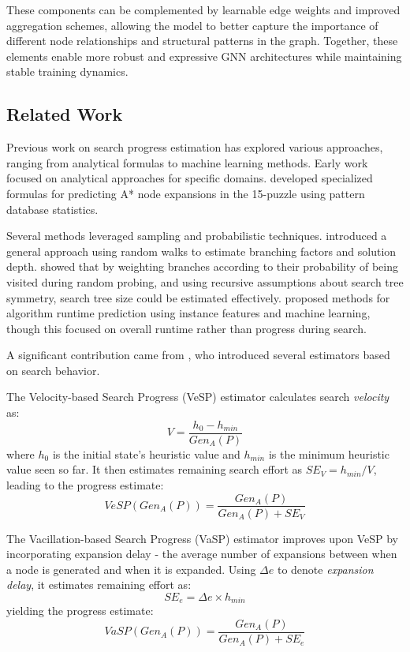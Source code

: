 \documentclass[letterpaper]{article}
\begin{document}
These components can be complemented by learnable edge weights and improved aggregation schemes, allowing the model to better capture the importance of different node relationships and structural patterns in the graph. Together, these elements enable more robust and expressive GNN architectures while maintaining stable training dynamics.


\subsection{Related Work}\label{subsec:related_work}

Previous work on search progress estimation has explored various approaches, ranging from analytical formulas to machine learning methods. Early work focused on analytical approaches for specific domains. \citet{breyer2008recent} developed specialized formulas for predicting A* node expansions in the 15-puzzle using pattern database statistics.

Several methods leveraged sampling and probabilistic techniques. \citet{lelis2014estimating} introduced a general approach using random walks to estimate branching factors and solution depth. \citet{kilby2006estimating} showed that by weighting branches according to their probability of being visited during random probing, and using recursive assumptions about search tree symmetry, search tree size could be estimated effectively. \citet{hutter2014algorithm} proposed methods for algorithm runtime prediction using instance features and machine learning, though this focused on overall runtime rather than progress during search.

A significant contribution came from \citet{thayer2012we}, who introduced several estimators based on search behavior.

The Velocity-based Search Progress (VeSP) estimator calculates search \emph{velocity} as:
\begin{equation*}
    V = \frac{h_0 - h_{min}}{Gen_A(P)}
\end{equation*}
where $h_0$ is the initial state's heuristic value and $h_{min}$ is the minimum heuristic value seen so far. It then estimates remaining search effort as $SE_V = h_{min}/V$, leading to the progress estimate:
\begin{equation}
    VeSP(Gen_A(P)) = \frac{Gen_A(P)}{Gen_A(P) + SE_V}
\end{equation}

The Vacillation-based Search Progress (VaSP) estimator improves upon VeSP by incorporating expansion delay - the average number of expansions between when a node is generated and when it is expanded. Using $\Delta e$ to denote \emph{expansion delay}, it estimates remaining effort as:
\begin{equation*}
    SE_e = \Delta e \times h_{min}
\end{equation*}
yielding the progress estimate:
\begin{equation}
    VaSP(Gen_A(P)) = \frac{Gen_A(P)}{Gen_A(P) + SE_e}
\end{equation}
\end{document}
